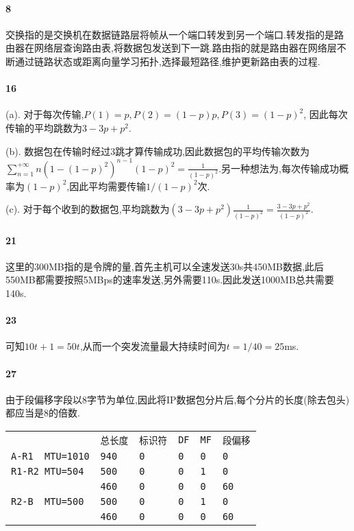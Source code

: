 \documentclass[a4paper]{article}
\begin{document}
\paragraph{8}
交换指的是交换机在数据链路层将帧从一个端口转发到另一个端口.转发指的是路由器在网络层查询路由表,将数据包发送到下一跳.路由指的就是路由器在网络层不断通过链路状态或距离向量学习拓扑,选择最短路径,维护更新路由表的过程.
\paragraph{16}
(a). 对于每次传输,$P(1)=p,P(2)=(1-p)p,P(3)=(1-p)^2$, 因此每次传输的平均跳数为$3-3p+p^2$.

(b). 数据包在传输时经过3跳才算传输成功,因此数据包的平均传输次数为$\sum_{n=1}^{+\infty}n(1-(1-p)^2)^{n-1}(1-p)^2=\frac{1}{(1-p)^2}$.另一种想法为,每次传输成功概率为$(1-p)^2$,因此平均需要传输$1/(1-p)^2$次.

(c). 对于每个收到的数据包,平均跳数为$(3-3p+p^2)\frac{1}{(1-p)^2}=\frac{3-3p+p^2}{(1-p)^2}$.
\paragraph{21}
这里的300MB指的是令牌的量,首先主机可以全速发送30s共450MB数据,此后550MB都需要按照5MBps的速率发送,另外需要110s.因此发送1000MB总共需要140s.
\paragraph{23}
可知$10t+1=50t$,从而一个突发流量最大持续时间为$t=1/40=25$ms.
\paragraph{27}
由于段偏移字段以8字节为单位,因此将IP数据包分片后,每个分片的长度(除去包头)都应当是8的倍数.
\begin{table}[H]
    \begin{tabular}{|llllll|}
        \hline
                              & \verb|总长度| & \verb|标识符| & \verb|DF| & \verb|MF| & \verb|段偏移| \\
        \verb|A-R1  MTU=1010| & \verb|940| & \verb|0|   & \verb|0|  & \verb|0|  & \verb|0|   \\
        \verb|R1-R2 MTU=504|  & \verb|500| & \verb|0|   & \verb|0|  & \verb|1|  & \verb|0|   \\
                              & \verb|460| & \verb|0|   & \verb|0|  & \verb|0|  & \verb|60|  \\
        \verb|R2-B  MTU=500|  & \verb|500| & \verb|0|   & \verb|0|  & \verb|1|  & \verb|0|   \\
                              & \verb|460| & \verb|0|   & \verb|0|  & \verb|0|  & \verb|60|  \\ \hline
    \end{tabular}
\end{table}
\end{document}
